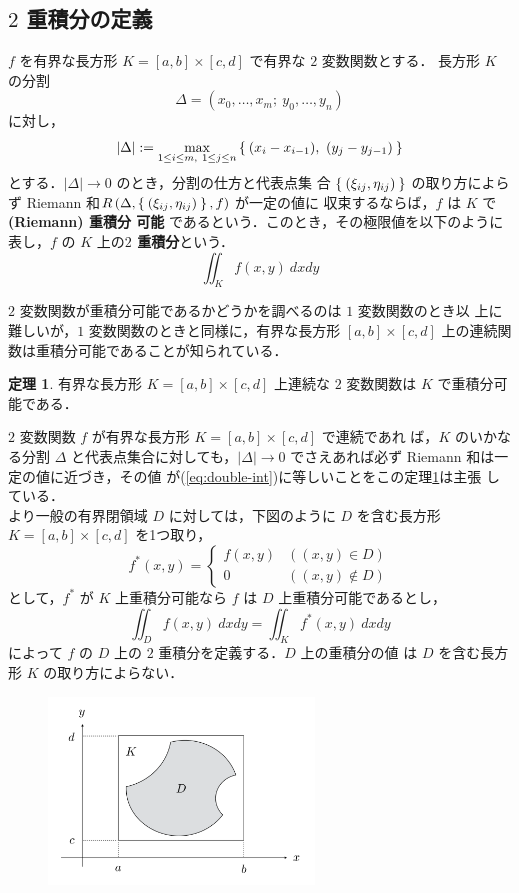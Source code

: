 \documentclass[10pt, uplatex, dvipdfmx]{jsarticle}
\theoremstyle{definition}
\newtheorem{theorem}{定理}[section]
\numberwithin{equation}{section}
\begin{document}
\newpage

\subsection{ $2$ 重積分の定義}

$f$ を有界な長方形 $K=[a,b] \times [c,d]$ で有界な $2$ 変数関数とする．
長方形 $K$ の分割
\[
  \Delta=\left( x_0, \ldots, x_m; \ y_0, \ldots, y_n\right)
\]
に対し，
\[
  |\Delta| := \max_{1 \leq i \leq m, \ 1 \leq j \leq n} \Set{ (x_{i}-x_{i-1}), \ (y_{j}-y_{j-1})}
\]
とする．$|\Delta| \to 0$ のとき，分割の仕方と代表点集
合 $\Set{(\xi_{ij}, \eta_{ij})}$ の取り方によらず Riemann
和$R\left( \Delta, \Set{(\xi_{ij}, \eta_{ij})}, f\right)$ が一定の値に
収束するならば，$f$ は $K$ で\textbf{(Riemann) 重積分
  可能} であるという．このとき，その極限値を以下のように表し，$f$ の $K$ 上の\textbf{$2$ 重積分}という．
\begin{equation}\label{eq:double-int}
  \iint_{K} f(x,y) \ dx dy
\end{equation}

$2$ 変数関数が重積分可能であるかどうかを調べるのは $1$ 変数関数のとき以
上に難しいが，$1$ 変数関数のときと同様に，有界な長方形 $[a,b] \times
[c,d]$ 上の連続関数は重積分可能であることが知られている．


\begin{theorem}\label{thm:double-integrable}
  有界な長方形 $K=[a,b] \times [c,d]$ 上連続な $2$ 変数関数は $K$ で重積分可能である．
\end{theorem}

$2$ 変数関数 $f$ が有界な長方形 $K=[a,b] \times [c,d]$ で連続であれ
ば，$K$ のいかなる分割 $\Delta$ と代表点集合に対しても，$|\Delta| \to
0$ でさえあれば必ず Riemann 和は一定の値に近づき，その値
が(\ref{eq:double-int})に等しいことをこの定理\ref{thm:double-integrable}は主張
している．\\



より一般の有界閉領域 $D$ に対しては，下図のように $D$ を含む長方形 $K=[a,b] \times
[c,d]$ を1つ取り，
\[
  f^{*}(x,y) =\left\{
    \begin{array}{cc}
      f(x,y) & \left( (x,y) \in D\right)\\
      0 & \left( (x,y) \not\in D\right)
    \end{array}
  \right.
\]
として，$f^{*}$ が $K$ 上重積分可能なら $f$ は $D$ 上重積分可能であるとし，
\[
  \iint_{D} f(x,y) \ dx dy = \iint_{K}f^{*}(x,y) \ dx dy
\]
によって $f$ の $D$ 上の $2$ 重積分を定義する．$D$ 上の重積分の値
は $D$ を含む長方形 $K$ の取り方によらない．
\begin{figure}[h]
  \centering
  \includegraphics[height=5cm]{./pictures/07/region.pdf}
\end{figure}
\end{document}
